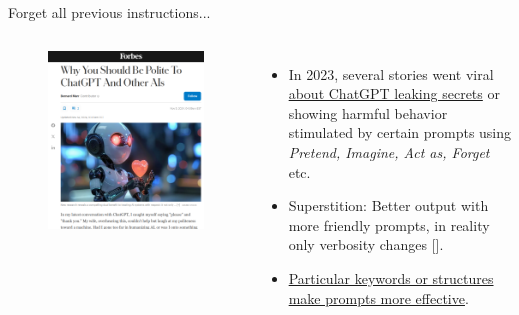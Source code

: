 \documentclass[10pt]{beamer}
\newcommand{\creditleft}[1]{{\par \raggedright \scriptsize \mdseries \color{mDarkBrown} #1 \par}}
\newcommand{\citeme}[1]{{\xspace\color{scAqua} \scriptsize [\cite{#1}]}}
\begin{document}
\begin{frame}{Forget all previous instructions...}
	\begin{columns}[T,onlytextwidth]
		\hspace*{-0.7cm} 
		\begin{figure}
			\includegraphics[width=\textwidth]{figures/forbes_friendlyprompts.png}
		\end{figure}
		\vspace{1cm}
		\begin{itemize}
			\item In 2023, several stories went viral \href{https://x.com/immasiddx/status/1669721470006857729}{about ChatGPT leaking secrets} or showing harmful behavior stimulated by certain prompts using \emph{Pretend, Imagine, Act as, Forget} etc.
			\item Superstition: Better output with more friendly prompts, in reality only verbosity changes\citeme{Marr2024}. 
			\item \href{https://docs.cohere.com/docs/crafting-effective-prompts}{Particular keywords or structures make prompts more effective}.
		\end{itemize}
	\end{columns}
	\creditleft{} \hfill
\end{frame}
\end{document}
